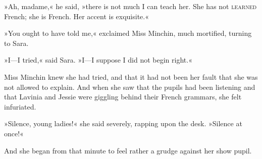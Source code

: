 »Ah, madame,« he said, »there is not much I can teach her. She has not \textsc{learned} French; she is French. Her accent is exquisite.«

»You ought to have told me,« exclaimed Miss Minchin, much mortified, turning to Sara.

»I—I tried,« said Sara. »I—I suppose I did not begin right.«

Miss Minchin knew she had tried, and that it had not been her fault that she was not allowed to explain. And when she saw that the pupils had been listening and that Lavinia and Jessie were giggling behind their French grammars, she felt infuriated.

»Silence, young ladies!« she said severely, rapping upon the desk. »Silence at once!«

And she began from that minute to feel rather a grudge against her show pupil.